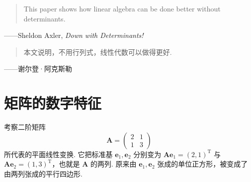 \documentclass[lang=cn,10.5pt,scheme=chinese,toc=twocol,section,chinesefont=nofont,
twoside,citestyle=gb7714-2015,bibstyle=gb7714-2015]{elegantbook}
\newcommand{\vv}[1]{\boldsymbol{#1}}
\newcommand{\trans}{\mathrm{T}}             %
\numberwithin{equation}{section}   %
\begin{document}
\newpage

\begin{tcolorbox}[epigraph]
  \begin{quote}
    This paper shows how linear algebra can be done better without determinants.
  \end{quote}
  \begin{flushright}
    ——Sheldon Axler, \textit{Down with Determinants!}
  \end{flushright}
  \begin{quote}
    本文说明，不用行列式，线性代数可以做得更好.
  \end{quote}
  \begin{flushright}
    ——谢尔登·阿克斯勒\footnotemark
  \end{flushright}
\end{tcolorbox}
\section{矩阵的数字特征}

考察二阶矩阵 $$\vv A=
  \begin{pmatrix}
    2 & 1 \\1&3
  \end{pmatrix}
$$ 所代表的平面线性变换. 它把标准基 $\vv e_1,\vv e_2$ 分别变为 $\vv A\vv e_1=(2,1)^\trans$ 与 $\vv A\vv e_2=(1,3)^\trans$，也就是 $\vv A$ 的两列. 原来由 $\vv e_1,\vv e_2$ 张成的单位正方形，被变成了由两列张成的平行四边形.
\end{document}
